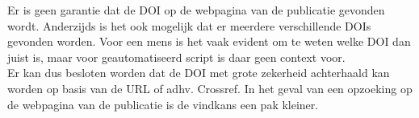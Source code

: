 Er is geen garantie dat de DOI op de webpagina van de publicatie gevonden wordt. Anderzijds is het ook mogelijk dat er meerdere verschillende DOIs gevonden worden. Voor een mens is het vaak evident om te weten welke DOI dan juist is, maar voor geautomatiseerd script is daar geen context voor.\\
Er kan dus besloten worden dat de DOI met grote zekerheid achterhaald kan worden op basis van de URL of adhv. Crossref. In het geval van een opzoeking op de webpagina van de publicatie is de vindkans een pak kleiner.

